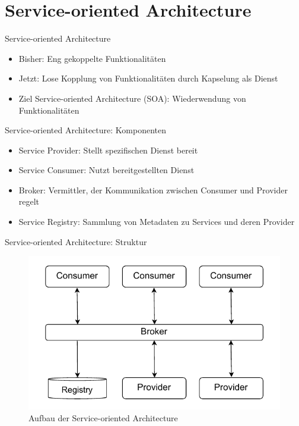\section{Service-oriented Architecture}

\begin{frame}{Service-oriented Architecture}
    \begin{itemize}
        \item Bisher: Eng gekoppelte Funktionalitäten
        \item Jetzt: Lose Kopplung von Funktionalitäten durch Kapselung als Dienst
        \item Ziel Service-oriented Architecture (SOA): Wiederwendung von Funktionalitäten
    \end{itemize}
\end{frame}

\begin{frame}{Service-oriented Architecture: Komponenten}
    \begin{itemize}
        \item Service Provider: Stellt spezifischen Dienst bereit
        \item Service Consumer: Nutzt bereitgestellten Dienst
        \item Broker: Vermittler, der Kommunikation zwischen Consumer und Provider regelt
        \item Service Registry: Sammlung von Metadaten zu Services und deren Provider
    \end{itemize}
\end{frame}

\begin{frame}{Service-oriented Architecture: Struktur}
    \begin{figure}[!h]
        \centering
        \includegraphics[scale=0.80]{imglib/soa/soa}
        \caption{Aufbau der Service-oriented Architecture}
        \label{fig:soa}
    \end{figure}
\end{frame}

